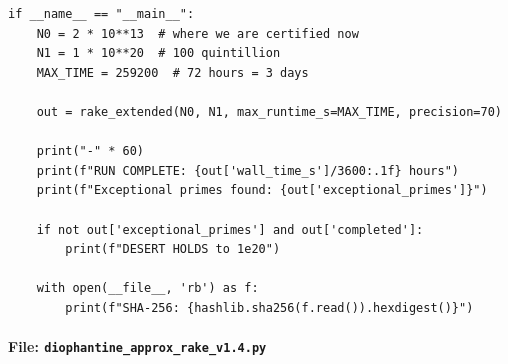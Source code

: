 \documentclass[11pt,a4paper]{article}
\begin{document}
\begin{lstlisting}
if __name__ == "__main__":
    N0 = 2 * 10**13  # where we are certified now
    N1 = 1 * 10**20  # 100 quintillion
    MAX_TIME = 259200  # 72 hours = 3 days

    out = rake_extended(N0, N1, max_runtime_s=MAX_TIME, precision=70)

    print("-" * 60)
    print(f"RUN COMPLETE: {out['wall_time_s']/3600:.1f} hours")
    print(f"Exceptional primes found: {out['exceptional_primes']}")

    if not out['exceptional_primes'] and out['completed']:
        print(f"DESERT HOLDS to 1e20")

    with open(__file__, 'rb') as f:
        print(f"SHA-256: {hashlib.sha256(f.read()).hexdigest()}")
\end{lstlisting}

\paragraph{File: \texttt{diophantine\_approx\_rake\_v1.4.py}}
\end{document}
